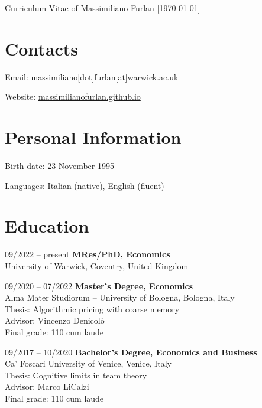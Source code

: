 \documentclass[11pt,a4paper]{article}
\begin{document}
\date{}
\thispagestyle{empty}
\setlength\cvlabelwidth{90pt}

\begin{cv}{\LARGE Curriculum Vitae of Massimiliano Furlan \large{[\mydatestyle\today]}} 

\section{Contacts}

\begin{cvlist}{}
	\itemsep -4pt
	\item[Email:] \href{mailto:massimiliano[dot]furlan[at]warwick.ac.uk}{massimiliano[dot]furlan[at]warwick.ac.uk}
	\item[Website:] \href{https://massimilianofurlan.github.io}{massimilianofurlan.github.io}
\end{cvlist}
\vspace{-20pt}

\section{Personal Information}

\begin{cvlist}{}
	\itemsep -4pt
	\item[Birth date:] 23 November 1995
	\item[Languages:] Italian (native), English (fluent)
\end{cvlist}
\vspace{-20pt}

\section{Education}

\begin{cvlist}{}
	\item[09/2022 -- \hspace{0.1pt} present] \textbf{MRes/PhD, Economics}\\ 
		University of Warwick, Coventry, United Kingdom
	\item[09/2020 -- 07/2022] \textbf{Master's Degree, Economics}\\ 
		Alma Mater Studiorum -- University of Bologna, Bologna, Italy\\
		Thesis: Algorithmic pricing with coarse memory\\
		Advisor: Vincenzo Denicolò\\
		Final grade: 110 cum laude%
	\item[09/2017 -- 10/2020] \textbf{Bachelor's Degree, Economics and Business} \\
		Ca' Foscari University of Venice, Venice, Italy\\
		Thesis: Cognitive limits in team theory\\
		Advisor: Marco LiCalzi\\
		Final grade: 110 cum laude%
\end{cvlist}
\vspace{-20pt}


\end{cv}
\end{document}
